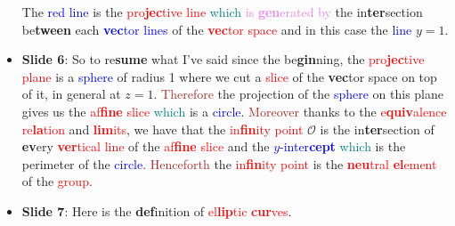 \begin{itemize}
            The \textcolor{blue}{red line} is the \textcolor{red}{pro\textbf{jec}tive line} \textcolor{teal}{which} \textcolor{violet}{is
                \textbf{gen}erated by} the in\textbf{ter}section be\textbf{tween}
            each \textcolor{blue}{\textbf{vec}tor lines}
            of the \textcolor{red}{\textbf{vec}tor space} and in this case the \textcolor{blue}{line} $y=1$.

        \item \textbf{Slide 6}: So to re\textbf{sume} what I've said since the be\textbf{gin}ning, the
            \textcolor{red}{pro\textbf{jec}tive plane} is a \textcolor{blue}{sphere} of radius
            1 where we cut a
            \textcolor{red}{slice} of the \textbf{vec}tor space on top of it, in general at $z=1$.
            \textcolor{brown}{Therefore} the projection of the \textcolor{blue}{sphere} on this plane gives us the
            \textcolor{red}{af\textbf{fine} slice}
            \textcolor{teal}{which} is a \textcolor{blue}{circle}.
             \textcolor{brown}{Moreover} thanks to the
            \textcolor{red}{e\textbf{quiv}alence re\textbf{la}tion} and \textcolor{red}{\textbf{lim}its}, we have that the
            \textcolor{red}{in\textbf{fin}ity
            point} $\mathcal{O}$ is the in\textbf{ter}section of \textbf{ev}ery \textcolor{red}{\textbf{ver}tical line} of the
            \textcolor{red}{af\textbf{fine} slice} and the \textcolor{blue}{$y$-inter\textbf{cept}}
            \textcolor{teal}{which} is the perimeter of the \textcolor{blue}{circle}. \textcolor{brown}{Henceforth}
            the \textcolor{red}{in\textbf{fin}ity point} is the \textcolor{red}{\textbf{neu}tral
            \textbf{el}ement} of the \textcolor{red}{group}.
        \item \textbf{Slide 7}: Here is the \textbf{def}inition of \textcolor{red}{el\textbf{lip}tic \textbf{cur}ves}.


\end{itemize}
